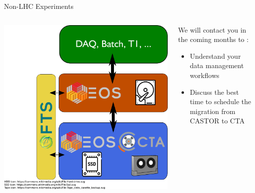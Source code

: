 \documentclass[aspectratio=1610]{beamer}
\begin{document}
\begin{frame}{Non-LHC Experiments}
\begin{columns}
	\begin{column}{0.4\textwidth}
		\begin{center}
		  \includegraphics[width=\textwidth]{images/CTA_Deployment_small}
		\end{center}
	\end{column}
	\begin{column}{0.55\textwidth}
		We will contact you in the coming months to :
		\begin{itemize}
		  \item Understand your data management workflows
        \item Discuss the best time to schedule the migration from CASTOR to CTA
		\end{itemize}
	\end{column}
\end{columns}
\end{frame}
\end{document}
